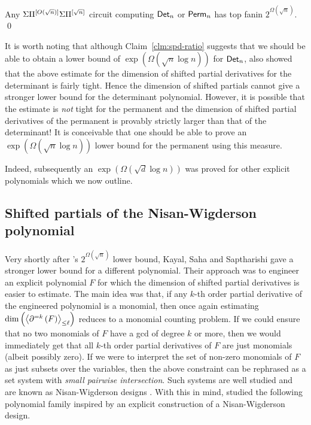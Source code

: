 \begin{theorem}
Any $\Sigma\Pi^{[O(\sqrt{n})]}\Sigma\Pi^{[\sqrt{n}]}$ circuit computing $\mathsf{Det}_n$ or $\mathsf{Perm}_n$ has top fanin $2^{\Omega(\sqrt{n})}$. \qed
\end{theorem}

It is worth noting that although Claim~\ref{clm:spd-ratio} suggests that we should be able to obtain a lower bound of $\exp(\Omega(\sqrt{n}\log n))$ for $\mathsf{Det}_n$, \cite{gkks13} also showed that the above estimate for the dimension of shifted partial derivatives for the determinant is fairly tight. Hence the dimension of shifted partials cannot give a stronger lower bound for the determinant polynomial. However, it is possible that the estimate is \emph{not} tight for the permanent and the dimension of shifted partial derivatives of the permanent is provably strictly larger than that of the determinant! It is conceivable that one should be able to prove an $\exp(\Omega(\sqrt{n}\log n))$ lower bound for the permanent using this measure. 

Indeed, subsequently an $\exp(\Omega(\sqrt{d}\log n))$ was proved \cite{KSS13,FLMS13} for other explicit polynomials  which we now outline. 

\subsection{Shifted partials of the Nisan-Wigderson polynomial}

Very shortly after \cite{gkks13}'s $2^{\Omega(\sqrt{n})}$ lower bound, Kayal, Saha and Saptharishi \cite{KSS13} gave a stronger lower bound for a different polynomial. Their approach was to engineer an explicit polynomial $F$ for which the dimension of shifted partial derivatives is easier to estimate. The main idea was that, if any $k$-th order partial derivative of the engineered polynomial is a monomial, then once again estimating $\dim\left(\left\langle\partial^{=k}\left(F\right)\right\rangle_{\leq \ell}\right)$ reduces to a monomial counting problem. If we could ensure that no two monomials of $F$ have a gcd of degree $k$ or more, then we would immediately get that all $k$-th order partial derivatives of $F$ are just monomials (albeit possibly zero). If we were to interpret the set of non-zero monomials of $F$ as just subsets over the variables, then the above constraint can be rephrased as a set system with \emph{small pairwise intersection}. Such systems are well studied and are known as Nisan-Wigderson designs \cite{nw94}.  With this in mind, \cite{KSS13} studied the following polynomial family inspired by an explicit construction of a Nisan-Wigderson design. 

